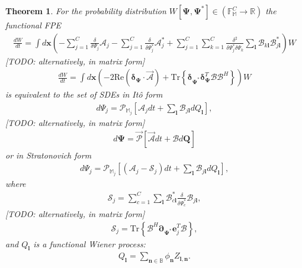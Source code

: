 \documentclass[12pt,aip,jmp,amssymb,amsmath]{revtex4-1}
\newtheorem{theorem}{Theorem}
\begin{document}
\begin{theorem}
\label{thm:app-fpe:fpe-sde-func}
    For the probability distribution $W[\boldsymbol{\Psi}, \boldsymbol{\Psi}^*] \in (\mathbb{F}_{\mathbb{M}}^C \rightarrow \mathbb{R})$ the functional FPE
    \begin{eqnarray*}
        \frac{dW}{dt}
        = \int d\boldsymbol{x} \left(
            - \sum_{j=1}^C \frac{\delta}{\delta \Psi_j} \mathcal{A}_j
            - \sum_{j=1}^C \frac{\delta}{\delta \Psi_j^*} \mathcal{A}_j^*
            + \sum_{j=1}^C \sum_{k=1}^C \frac{\delta^2}{\delta \Psi_j^* \delta \Psi_k}
                \sum_{\boldsymbol{l}} \mathcal{B}_{k \boldsymbol{l}} \mathcal{B}_{j \boldsymbol{l}}^*
        \right) W
    \end{eqnarray*}
    [TODO: alternatively, in matrix form]
    \begin{eqnarray*}
        \frac{dW}{dt}
        = \int d\boldsymbol{x} \left(
            - 2 \mathrm{Re} \left( \boldsymbol{\delta}_{\boldsymbol{\Psi}} \cdot \vec{\mathcal{A}} \right)
            + \mathrm{Tr} \left\{ \boldsymbol{\delta}_{\boldsymbol{\Psi}^*} \boldsymbol{\delta}_{\boldsymbol{\Psi}}^T \mathcal{B} \mathcal{B}^H \right\}
        \right) W
    \end{eqnarray*}
    is equivalent to the set of SDEs in It\^{o} form
    \begin{eqnarray*}
        d\Psi_j = \mathcal{P}_{\mathbb{M}_j} \left[
            \mathcal{A}_j dt + \sum_{\boldsymbol{l}} \mathcal{B}_{j \boldsymbol{l}} dQ_{\boldsymbol{l}}
        \right],
    \end{eqnarray*}
    [TODO: alternatively, in matrix form]
    \begin{eqnarray*}
        d\boldsymbol{\Psi} = \vec{\mathcal{P}} \left[
            \vec{\mathcal{A}} dt + \mathcal{B} d\boldsymbol{Q}
        \right]
    \end{eqnarray*}
    or in Stratonovich form
    \begin{eqnarray*}
        d\Psi_j = \mathcal{P}_{\mathbb{M}_j} \left[
            (\mathcal{A}_j - \mathcal{S}_j) dt + \sum_{\boldsymbol{l}} \mathcal{B}_{j \boldsymbol{l}} dQ_{\boldsymbol{l}}
        \right],
    \end{eqnarray*}
    where
    \begin{eqnarray*}
        \mathcal{S}_j = \sum_{c=1}^C \sum_{\boldsymbol{l}}
            \mathcal{B}_{c \boldsymbol{l}}^*
            \frac{\delta}{\delta \Psi_c^*}
            \mathcal{B}_{j \boldsymbol{l}},
    \end{eqnarray*}
    [TODO: alternatively, in matrix form]
    \begin{eqnarray*}
        \mathcal{S}_j = \mathrm{Tr} \left\{ \mathcal{B}^H \boldsymbol{\partial}_{\boldsymbol{\Psi}^*} \boldsymbol{e}_j^T \mathcal{B} \right\},
    \end{eqnarray*}
    and $Q_{\boldsymbol{l}}$ is a functional Wiener process:
    \begin{eqnarray*}
        Q_{\boldsymbol{l}} = \sum_{\boldsymbol{n} \in \mathbb{B}} \phi_{\boldsymbol{n}} Z_{\boldsymbol{l},\boldsymbol{n}}.
    \end{eqnarray*}
\end{theorem}
\end{document}
